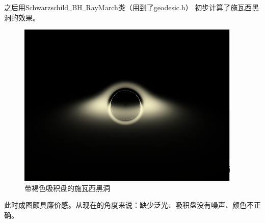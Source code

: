 \documentclass[a4paper, 12pt]{article}
\begin{document}
    之后用Schwarzschild\underline \ BH\underline \ RayMarch类（用到了geodesic.h）
    初步计算了施瓦西黑洞的效果。
    \begin{figure}[H]
        \centering
        \includegraphics[width=0.95\textwidth]{photo/Swz_BH_1.png}
        \caption{带褐色吸积盘的施瓦西黑洞}
    \end{figure}
    此时成图颇具廉价感。从现在的角度来说：缺少泛光、吸积盘没有噪声、颜色不正确。
\end{document}
